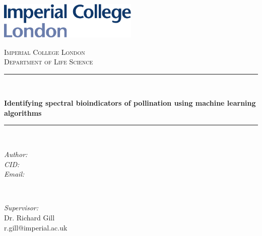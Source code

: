 
\begin{titlepage}
	\newcommand{\HRule}{\rule{\linewidth}{0.5mm}}

    \includegraphics[width=0.5\textwidth]{imperial.pdf}\par\vspace{1.0cm}

	\center %



	\textsc{\LARGE Imperial College London}\\[0.5cm]

	\textsc{\Large Department of Life Science}\\[0.5cm]



	\HRule\\[0.1cm]

	{\huge\bfseries Identifying spectral bioindicators of pollination using machine learning algorithms \par}

	\HRule\\[1.2cm]


	\begin{minipage}{0.45\textwidth}
		\begin{flushleft}
			\large
			\textit{Author: }
			\\
			\textit{CID: }
			\\
			\textit{Email:}
		\end{flushleft}
	\end{minipage}
	~
	\begin{minipage}{0.45\textwidth}
		\begin{flushright}
			\large
			\textit{Supervisor: }\\
			Dr. Richard Gill\\%
			r.gill@imperial.ac.uk
		\end{flushright}
	\end{minipage}





\end{titlepage}
